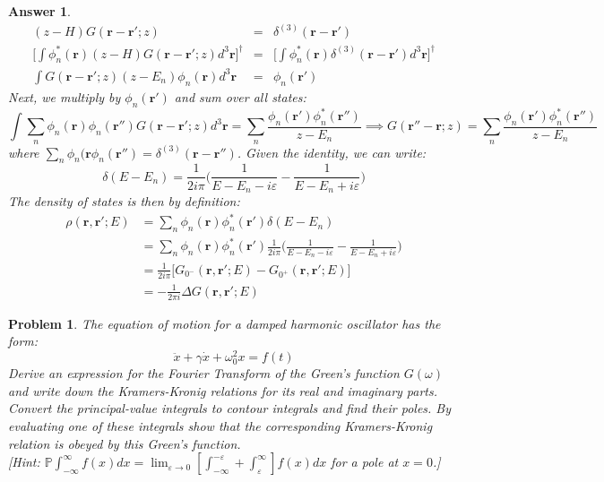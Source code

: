 \documentclass[a4paper]{article}
\newtheorem{ans}{Answer}[section]
\theoremstyle{new}
\newtheorem{qns}{Problem}[section]
\begin{document}
\begin{ans}
\begin{eqnarray}
(z-H)G(\mathbf{r}-\mathbf{r'};z)&=&\delta^{(3)}(\mathbf{r}-\mathbf{r'})\nonumber\\\bigg[\int\phi_n^*(\mathbf{r})(z-H)G(\mathbf{r}-\mathbf{r'};z)d^3\mathbf{r}\bigg]^\dag&=&\bigg[\int\phi_n^*(\mathbf{r})\delta^{(3)}(\mathbf{r}-\mathbf{r'})d^3\mathbf{r}\bigg]^\dag\nonumber\\\int G(\mathbf{r}-\mathbf{r'};z)(z-E_n)\phi_n(\mathbf{r})d^3\mathbf{r}&=&\phi_n(\mathbf{r'})\nonumber
\end{eqnarray}
Next, we multiply by $\phi_n(\mathbf{r'})$ and sum over all states:
$$\int\sum_n\phi_n(\mathbf{r})\phi_n(\mathbf{r''})G(\mathbf{r}-\mathbf{r'};z)d^3\mathbf{r}=\sum_n\frac{\phi_n(\mathbf{r'})\phi_n^*(\mathbf{r''})}{z-E_n}\implies G(\mathbf{r''}-\mathbf{r};z)=\sum_n\frac{\phi_n(\mathbf{r'})\phi_n^*(\mathbf{r''})}{z-E_n}$$
where $\sum_n\phi_n(\mathbf{r}\phi_n(\mathbf{r''})=\delta^{(3)}(\mathbf{r}-\mathbf{r''})$. Given the identity, we can write:
$$\delta(E-E_n)=\frac{1}{2i\pi}\bigg(\frac{1}{E-E_n-i\varepsilon}-\frac{1}{E-E_n+i\varepsilon}\bigg)$$
The density of states is then by definition:
\begin{align}
    \rho(\mathbf{r},\mathbf{r'};E)&=\sum_n\phi_n(\mathbf{r})\phi_n^*(\mathbf{r'})\delta(E-E_n)\nonumber\\&=\sum_n\phi_n(\mathbf{r})\phi_n^*(\mathbf{r'})\frac{1}{2i\pi}\bigg(\frac{1}{E-E_n-i\varepsilon}-\frac{1}{E-E_n+i\varepsilon}\bigg)\nonumber\\&=\frac{1}{2i\pi}\bigg[G_{0^-}(\mathbf{r},\mathbf{r'};E)-G_{0^+}(\mathbf{r},\mathbf{r'};E)\bigg]\nonumber\\&=-\frac{1}{2\pi i}\Delta G(\mathbf{r},\mathbf{r'};E)\nonumber
\end{align}
\end{ans}
\newpage
\begin{qns}
The equation of motion for a damped harmonic oscillator has the form:
$$\ddot{x}+\gamma\dot{x}+\omega_0^2x=f(t)$$
Derive an expression for the Fourier Transform of the Green’s function $G(\omega)$ and write down the Kramers-Kronig relations for its real and imaginary parts.\\[5pt]
Convert the principal-value integrals to contour integrals and find their poles. By evaluating one of these integrals show that the corresponding Kramers-Kronig relation is obeyed by this Green’s function.\\[5pt]
[Hint: $\mathbb{P}\int_{-\infty}^\infty f(x)dx=\lim_{\varepsilon\rightarrow 0}[\int_{-\infty}^{-\varepsilon}+\int_\varepsilon^\infty]f(x)dx$ for a pole at $x=0$.]
\end{qns}
\end{document}

